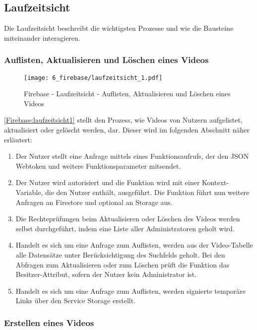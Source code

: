 \subsection{Laufzeitsicht}

Die Laufzeitsicht beschreibt die wichtigsten Prozesse und wie die Bausteine miteinander interagieren.

\subsubsection{Auflisten, Aktualisieren und Löschen eines Videos}

\begin{figure}
  \centering
  \texttt{[image: 6\_firebase/laufzeitsicht\_1.pdf]}
  \caption{Firebase - Laufzeitsicht - Auflisten, Aktualisieren und Löschen eines Videos}
  \label{Firebase:laufzeitsicht1}
\end{figure}

\autoref{Firebase:laufzeitsicht1} stellt den Prozess, wie Videos von Nutzern aufgelistet, aktualisiert oder gelöscht werden, dar. Dieser wird im folgenden Abschnitt näher erläutert:

\begin{enumerate}
  \item{Der Nutzer stellt eine Anfrage mittels eines Funktionsaufrufs, der den JSON Webtoken und weitere Funktionsparameter mitsendet.}
  \item{Der Nutzer wird autorisiert und die Funktion wird mit einer Kontext-Variable, die den Nutzer enthält, ausgeführt. Die Funktion führt nun weitere Anfragen an Firestore und optional an Storage aus.}
  \item{Die Rechteprüfungen beim Aktualisieren oder Löschen des Videos werden selbst durchgeführt, indem eine Liste aller Administratoren geholt wird.}
  \item{Handelt es sich um eine Anfrage zum Auflisten, werden aus der Video-Tabelle alle Datensätze unter Berücksichtigung des Suchfelds geholt. Bei den Abfragen zum Aktualisieren oder zum Löschen prüft die Funktion das Besitzer-Attribut, sofern der Nutzer kein Administrator ist.}
  \item{Handelt es sich um eine Anfrage zum Auflisten, werden signierte temporäre Links über den Service Storage erstellt.}
\end{enumerate}

\subsubsection{Erstellen eines Videos}

